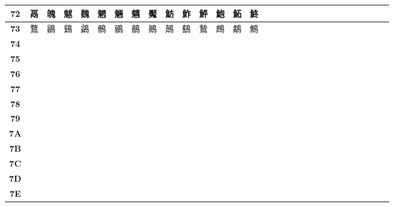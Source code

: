 \begin{table}[H]
\begin{tabular}{|Sc|Sc|Sc|Sc|Sc|Sc|Sc|Sc|Sc|Sc|Sc|Sc|Sc|Sc|Sc|}
\textbf{72} & 鬲 & 魄 & 魃 & 魏 & 魍 & 魎 & 魑 & 魘 & 魴 & 鮓 & 鮃 & 鮑 & 鮖 & 鮗 \\ \hline
\textbf{73} & 鶩 & 鶲 & 鷄 & 鷁 & 鶻 & 鶸 & 鶺 & 鷆 & 鷏 & 鷂 & 鷙 & 鷓 & 鷸 & 鷦 \\ \hline
\textbf{74} &  &  &  &  &  &  &  &  &  &  &  &  &  &  \\ \hline
\textbf{75} &  &  &  &  &  &  &  &  &  &  &  &  &  &  \\ \hline
\textbf{76} &  &  &  &  &  &  &  &  &  &  &  &  &  &  \\ \hline
\textbf{77} &  &  &  &  &  &  &  &  &  &  &  &  &  &  \\ \hline
\textbf{78} &  &  &  &  &  &  &  &  &  &  &  &  &  &  \\ \hline
\textbf{79} &  &  &  &  &  &  &  &  &  &  &  &  &  &  \\ \hline
\textbf{7A} &  &  &  &  &  &  &  &  &  &  &  &  &  &  \\ \hline
\textbf{7B} &  &  &  &  &  &  &  &  &  &  &  &  &  &  \\ \hline
\textbf{7C} &  &  &  &  &  &  &  &  &  &  &  &  &  &  \\ \hline
\textbf{7D} &  &  &  &  &  &  &  &  &  &  &  &  &  &  \\ \hline
\textbf{7E} &  &  &  &  &  &  &  &  &  &  &  &  &  &  \\ \hline
\end{tabular}
\end{table}


